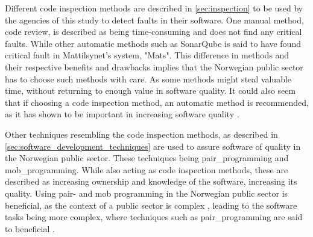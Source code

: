 Different code inspection methods are described in \autoref{sec:inspection} to be used by the agencies of this study to detect faults in their software. One manual method, code review, is described as being time-consuming and does not find any critical faults. While other automatic methods such as SonarQube is said to have found critical fault in Mattilsynet's system, "Mats". This difference in methods and their respective benefits and drawbacks implies that the Norwegian public sector has to choose such methods with care. As some methods might steal valuable time, without returning to enough value in software quality. It could also seem that if choosing a code inspection method, an automatic method is recommended, as it has shown to be important in increasing software quality \cite{smm_2018}.


Other techniques resembling the code inspection methods, as described in \autoref{sec:software_development_techniques} are used to assure software of quality in the Norwegian public sector. These techniques being \gls{pair_programming} and \gls{mob_programming}. While also acting as code inspection methods, these are described as increasing ownership and knowledge of the software, increasing its quality. Using pair- and mob programming in the Norwegian public sector is beneficial, as the context of a public sector is complex \cite{jc_2010}, leading to the software tasks being more complex, where techniques such as \gls{pair_programming} are said to beneficial \cite{jeh_2009}. 


